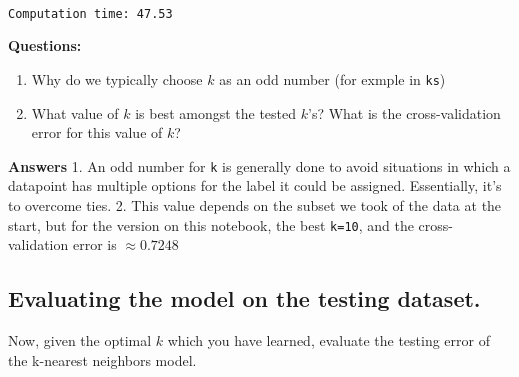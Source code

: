 \documentclass[11pt]{article}
\begin{document}
    \begin{center}
    \end{center}
    { \hspace*{\fill} \\}
    
    \begin{Verbatim}[commandchars=\\\{\}]
Computation time: 47.53

    \end{Verbatim}

    \textbf{Questions:}

\begin{enumerate}
\def\labelenumi{(\arabic{enumi})}
\item
  Why do we typically choose \(k\) as an odd number (for exmple in
  \texttt{ks})
\item
  What value of \(k\) is best amongst the tested \(k\)'s? What is the
  cross-validation error for this value of \(k\)?
\end{enumerate}

    \textbf{Answers} 1. An odd number for \texttt{k} is generally done to
avoid situations in which a datapoint has multiple options for the label
it could be assigned. Essentially, it's to overcome ties. 2. This value
depends on the subset we took of the data at the start, but for the
version on this notebook, the best \texttt{k=10}, and the
cross-validation error is \(\approx0.7248\)

    \hypertarget{evaluating-the-model-on-the-testing-dataset.}{%
\subsection{Evaluating the model on the testing
dataset.}\label{evaluating-the-model-on-the-testing-dataset.}}

Now, given the optimal \(k\) which you have learned, evaluate the
testing error of the k-nearest neighbors model.
\end{document}
